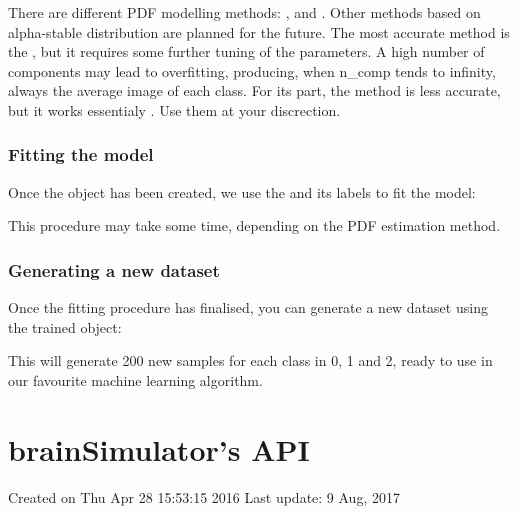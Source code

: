 \documentclass[letterpaper,10pt,english]{sphinxmanual}
\begin{document}
There are different PDF modelling methods: ,  and . Other methods based on alpha-stable distribution are planned for the future. The most accurate method is the , but it requires some further tuning of the parameters. A high number of components may lead to overfitting, producing, when n\_comp tends to infinity, always the average image of each class. For its part, the  method is less accurate, but it works essentialy . Use them at your discrection.


\subsection{Fitting the model}
\label{\detokenize{overview:fitting-the-model}}
Once the object has been created, we use the  and its labels to fit the model:

\begin{sphinxVerbatim}[commandchars=\\\{\}]
 
\end{sphinxVerbatim}

This procedure may take some time, depending on the PDF estimation method.


\subsection{Generating a new dataset}
\label{\detokenize{overview:generating-a-new-dataset}}
Once the fitting procedure has finalised, you can generate a new dataset using the trained object:

\begin{sphinxVerbatim}[commandchars=\\\{\}]
    \PYG{p}{[}  \PYG{p}{]}
\end{sphinxVerbatim}

This will generate 200 new samples for each class in 0, 1 and 2, ready to use in our favourite machine learning algorithm.


\chapter{brainSimulator’s API}
\label{\detokenize{api:brainsimulator-s-api}}\label{\detokenize{api:module-brainSimulator}}\label{\detokenize{api::doc}}\label{\detokenize{api:module-brainSimulator}}
Created on Thu Apr 28 15:53:15 2016
Last update: 9 Aug, 2017
\end{document}
